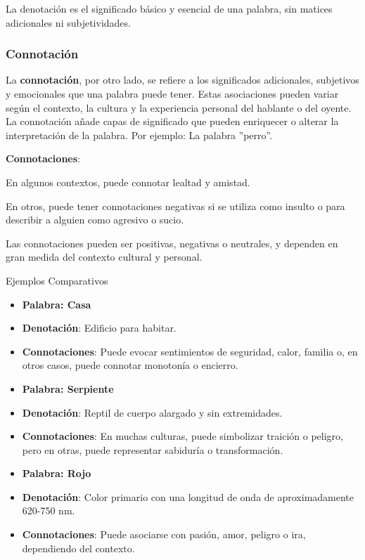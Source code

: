 La denotación es el significado básico y esencial de una palabra, sin matices adicionales ni subjetividades.

\subsubsection{Connotación}

La \textbf{connotación}, por otro lado, se refiere a los significados adicionales, subjetivos y emocionales que una palabra puede tener. Estas asociaciones pueden variar según el contexto, la cultura y la experiencia personal del hablante o del oyente. La connotación añade capas de significado que pueden enriquecer o alterar la interpretación de la palabra. Por ejemplo: La palabra ''perro''.

\textbf{Connotaciones}:

En algunos contextos, puede connotar lealtad y amistad.

En otros, puede tener connotaciones negativas si se utiliza como insulto o para describir a alguien como agresivo o sucio.

Las connotaciones pueden ser positivas, negativas o neutrales, y dependen en gran medida del contexto cultural y personal.

Ejemplos Comparativos

\begin{itemize}
      \item \textbf{Palabra: Casa}
      \item \textbf{Denotación}: Edificio para habitar.
      \item \textbf{Connotaciones}: Puede evocar sentimientos de seguridad, calor, familia o, en otros casos, puede connotar monotonía o encierro.
\end{itemize}

\begin{itemize}
      \item \textbf{Palabra: Serpiente}
      \item \textbf{Denotación}: Reptil de cuerpo alargado y sin extremidades.
      \item  \textbf{Connotaciones}: En muchas culturas, puede simbolizar traición o peligro, pero en otras, puede representar sabiduría o transformación.
\end{itemize}

\begin{itemize}
      \item \textbf{Palabra: Rojo}
      \item \textbf{Denotación}: Color primario con una longitud de onda de aproximadamente 620-750 nm.
      \item \textbf{Connotaciones}: Puede asociarse con pasión, amor, peligro o ira, dependiendo del contexto.
\end{itemize}

